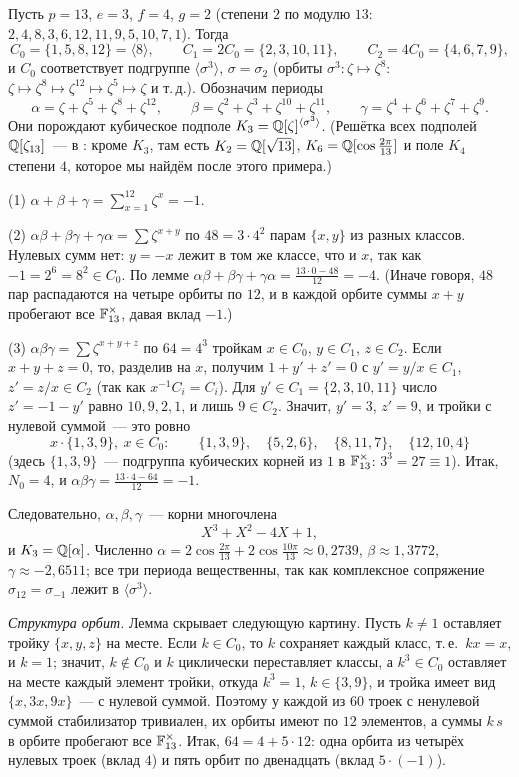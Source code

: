 \begin{example}
Пусть $p=13$, $e=3$, $f=4$, $g=2$ (степени $2$ по модулю $13$: $2,4,8,3,6,12,11,9,5,10,7,1$). Тогда
\[
C_0=\{1,5,8,12\}=\langle8\rangle,\qquad C_1=2C_0=\{2,3,10,11\},\qquad C_2=4C_0=\{4,6,7,9\},
\]
и $C_0$ соответствует подгруппе $\langle\sigma^3\rangle$, $\sigma=\sigma_2$ (орбиты $\sigma^3\colon\zeta\mapsto\zeta^8$: $\zeta\mapsto\zeta^8\mapsto\zeta^{12}\mapsto\zeta^5\mapsto\zeta$
и т.\,д.). Обозначим периоды
\[
\alpha=\zeta+\zeta^5+\zeta^8+\zeta^{12},\qquad\beta=\zeta^2+\zeta^3+\zeta^{10}+\zeta^{11},\qquad\gamma=\zeta^4+\zeta^6+\zeta^7+\zeta^9 .
\]
Они порождают кубическое подполе $K_3=\mathbb Q[\zeta]^{\langle\sigma^3\rangle}$. (Решётка всех подполей $\mathbb Q[\zeta_{13}]$~--- в
: кроме $K_3$, там есть $K_2=\mathbb Q[\sqrt{13}]$, $K_6=\mathbb Q[\cos\frac{2\pi}{13}]$ и поле $K_4$ степени $4$, которое мы
найдём после этого примера.)

(1) $\alpha+\beta+\gamma=\sum_{x=1}^{12}\zeta^x=-1$.

(2) $\alpha\beta+\beta\gamma+\gamma\alpha=\sum\zeta^{x+y}$ по $48=3\cdot4^2$ парам $\{x,y\}$ из разных классов. Нулевых сумм нет:
$y=-x$ лежит в том же классе, что и $x$, так как $-1=2^6=8^2\in C_0$. По лемме 
$\alpha\beta+\beta\gamma+\gamma\alpha=\frac{13\cdot0-48}{12}=-4$. (Иначе говоря, $48$ пар распадаются на четыре орбиты по $12$, и в
каждой орбите суммы $x+y$ пробегают все $\mathbb F_{13}^\times$, давая вклад $-1$.)

(3) $\alpha\beta\gamma=\sum\zeta^{x+y+z}$ по $64=4^3$ тройкам $x\in C_0$, $y\in C_1$, $z\in C_2$. Если $x+y+z=0$, то, разделив на
$x$, получим $1+y'+z'=0$ с $y'=y/x\in C_1$, $z'=z/x\in C_2$ (так как $x^{-1}C_i=C_i$). Для $y'\in C_1=\{2,3,10,11\}$ число
$z'=-1-y'$ равно $10,9,2,1$, и лишь $9\in C_2$. Значит, $y'=3$, $z'=9$, и тройки с нулевой суммой~--- это ровно
\[
x\cdot\{1,3,9\},\ x\in C_0:\qquad \{1,3,9\},\quad\{5,2,6\},\quad\{8,11,7\},\quad\{12,10,4\}
\]
(здесь $\{1,3,9\}$~--- подгруппа кубических корней из $1$ в $\mathbb F_{13}^\times$: $3^3=27\equiv1$). Итак, $N_0=4$, и
$\alpha\beta\gamma=\frac{13\cdot4-64}{12}=-1$.

Следовательно, $\alpha,\beta,\gamma$~--- корни многочлена
\[
X^3+X^2-4X+1,
\]
и $K_3=\mathbb Q[\alpha]$. Численно $\alpha=2\cos\frac{2\pi}{13}+2\cos\frac{10\pi}{13}\approx0{,}2739$, $\beta\approx1{,}3772$,
$\gamma\approx-2{,}6511$; все три периода вещественны, так как комплексное сопряжение $\sigma_{12}=\sigma_{-1}$ лежит в
$\langle\sigma^3\rangle$.

\emph{Структура орбит.} Лемма  скрывает следующую картину. Пусть $k\ne1$ оставляет тройку $\{x,y,z\}$ на месте. Если
$k\in C_0$, то $k$ сохраняет каждый класс, т.\,е.\ $kx=x$, и $k=1$; значит, $k\notin C_0$ и $k$ циклически переставляет классы, а
$k^3\in C_0$ оставляет на месте каждый элемент тройки, откуда $k^3=1$, $k\in\{3,9\}$, и тройка имеет вид
$\{x,3x,9x\}$~--- с нулевой суммой. Поэтому у каждой из $60$ троек с ненулевой суммой стабилизатор тривиален, их орбиты
имеют по $12$ элементов, а суммы $k\,s$ в орбите пробегают все $\mathbb F_{13}^\times$. Итак, $64=4+5\cdot12$: одна орбита из четырёх
нулевых троек (вклад $4$) и пять орбит по двенадцать (вклад $5\cdot(-1)$).


\end{example}
